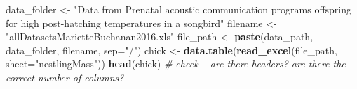 \documentclass[]{book}
\newenvironment{Shaded}{\begin{snugshade}}{\end{snugshade}}
\newcommand{\KeywordTok}[1]{\textcolor[rgb]{0.13,0.29,0.53}{\textbf{#1}}}
\newcommand{\DataTypeTok}[1]{\textcolor[rgb]{0.13,0.29,0.53}{#1}}
\newcommand{\StringTok}[1]{\textcolor[rgb]{0.31,0.60,0.02}{#1}}
\newcommand{\CommentTok}[1]{\textcolor[rgb]{0.56,0.35,0.01}{\textit{#1}}}
\newcommand{\NormalTok}[1]{#1}
\theoremstyle{definition}
\theoremstyle{definition}
\theoremstyle{definition}
\theoremstyle{remark}
\begin{document}
\begin{Shaded}
\begin{Highlighting}[]
\NormalTok{data_folder <-}\StringTok{ "Data from Prenatal acoustic communication programs offspring for high post-hatching temperatures in a songbird"}
\NormalTok{filename <-}\StringTok{ "allDatasetsMarietteBuchanan2016.xls"}
\NormalTok{file_path <-}\StringTok{ }\KeywordTok{paste}\NormalTok{(data_path, data_folder, filename, }\DataTypeTok{sep=}\StringTok{"/"}\NormalTok{)}
\NormalTok{chick <-}\StringTok{ }\KeywordTok{data.table}\NormalTok{(}\KeywordTok{read_excel}\NormalTok{(file_path, }\DataTypeTok{sheet=}\StringTok{"nestlingMass"}\NormalTok{))}
\KeywordTok{head}\NormalTok{(chick) }\CommentTok{# check -- are there headers? are there the correct number of columns?}
\end{Highlighting}
\end{Shaded}
\end{document}

